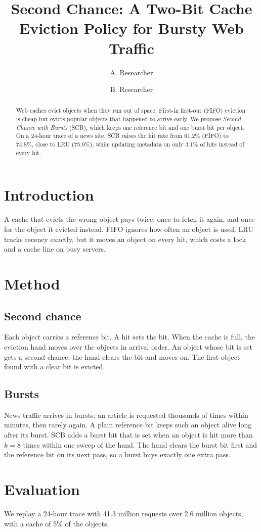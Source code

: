 \documentclass{article}
\title{Second Chance: A Two-Bit Cache Eviction Policy for Bursty Web Traffic}
\author{A. Researcher \and B. Researcher}
\begin{document}
\maketitle
\begin{abstract}
Web caches evict objects when they run out of space. First-in first-out (FIFO) eviction is cheap but evicts popular
objects that happened to arrive early. We propose \emph{Second Chance with Bursts} (SCB), which keeps one reference
bit and one burst bit per object. On a 24-hour trace of a news site, SCB raises the hit rate from 61.2\% (FIFO) to
74.8\%, close to LRU (75.9\%), while updating metadata on only 3.1\% of hits instead of every hit.
\end{abstract}

\section{Introduction}
A cache that evicts the wrong object pays twice: once to fetch it again, and once for the object it evicted instead.
FIFO ignores how often an object is used. LRU tracks recency exactly, but it moves an object on every hit, which costs
a lock and a cache line on busy servers.

\section{Method}
\subsection{Second chance}
Each object carries a reference bit. A hit sets the bit. When the cache is full, the eviction hand moves over the
objects in arrival order. An object whose bit is set gets a second chance: the hand clears the bit and moves on. The
first object found with a clear bit is evicted.

\subsection{Bursts}
News traffic arrives in bursts: an article is requested thousands of times within minutes, then rarely again. A plain
reference bit keeps such an object alive long after its burst. SCB adds a burst bit that is set when an object is hit
more than $k=8$ times within one sweep of the hand. The hand clears the burst bit first and the reference bit on its
next pass, so a burst buys exactly one extra pass.

\section{Evaluation}
We replay a 24-hour trace with 41.3 million requests over 2.6 million objects, with a cache of 5\% of the objects.
\end{document}
